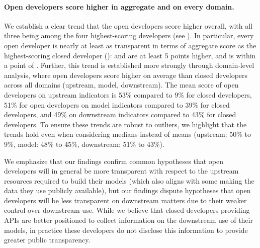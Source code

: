 \paragraph{Open developers score higher in aggregate and on every domain.}
We establish a clear trend that the open developers score higher overall, with all three being among the four highest-scoring developers (see ).
In particular, every open developer is nearly at least as transparent in terms of aggregate score as the highest-scoring closed developer (\openai): \meta and \huggingface are at least 5 points higher, and \stability is within a point of \openai.
Further, this trend is established more strongly through domain-level analysis, where open developers score higher on average than closed developers across all domains (\ie upstream, model, downstream).
The mean score of open developers on upstream indicators is 53\% compared to 9\% for closed developers, 51\% for open developers on model indicators compared to 39\% for closed developers, and 49\% on downstream indicators compared to 43\% for closed developers.
To ensure these trends are robust to outliers, we highlight that the trends hold even when considering medians instead of means (upstream: 50\% to 9\%, model: 48\% to 45\%, downstream: 51\% to 43\%).

We emphasize that our findings confirm common hypotheses that open developers will in general be more transparent with respect to the upstream resources required to build their models (which also aligns with some making the data they use publicly available), but our findings dispute hypotheses that open developers will be less transparent on downstream matters due to their weaker control over downstream use.
While we believe that closed developers providing APIs are better positioned to collect information on the downstream use of their models, in practice these developers do not disclose this information to provide greater public transparency.

